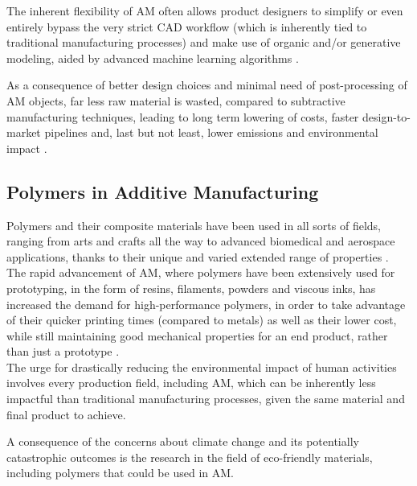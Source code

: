 \documentclass[a4paper]{article}
\begin{document}
    The inherent flexibility of AM often allows product designers to simplify or even entirely bypass the very strict CAD workflow (which is inherently tied to 
    traditional manufacturing processes) and make use of organic and/or generative modeling, aided by advanced machine learning algorithms \autocites{PBF_MachineLearning_FEM}. 

    As a consequence of better design choices and minimal need of post-processing of AM objects, far less raw material is wasted, compared to subtractive manufacturing techniques, leading to 
    long term lowering of costs, faster design-to-market pipelines and, last but not least, lower emissions and environmental 
    impact \autocites{Recent_progress_polymers_AM,AM_design_review}. 

    \subsection{Polymers in Additive Manufacturing\label{Polymers_in_AM}}

    Polymers and their composite materials have been used in all sorts of fields, ranging from arts and crafts all the way to advanced biomedical and aerospace applications, thanks 
    to their unique and varied extended range of properties \autocites{Recent_progress_polymers_AM,Latvian_additive,Materials_add_man_718,Messori_Bondioli_PHAs,doi:10.1063/1.4918516,SLS_3dprinting_biomedical_polymers,Kovalcik_PHA_Review,Mouritz}. \\  
    
    The rapid advancement of AM, where polymers have been extensively used for prototyping, in the form of resins, filaments, powders and viscous inks, 
    has increased the demand for high-performance polymers, in order to take advantage of their quicker printing times (compared to metals) as well as their lower cost, while still
    maintaining good mechanical properties for an end product, rather than just a prototype \autocite*{Recent_progress_polymers_AM}. \\ 

    The urge for drastically reducing the environmental impact of human activities involves every production field, including AM, which can be inherently less impactful
    than traditional manufacturing processes, given the same material and final product to achieve. 

    A consequence of the concerns about climate change and its potentially catastrophic outcomes is the research in the field of eco-friendly materials, including polymers 
    that could be used in AM. 
    
\end{document}
